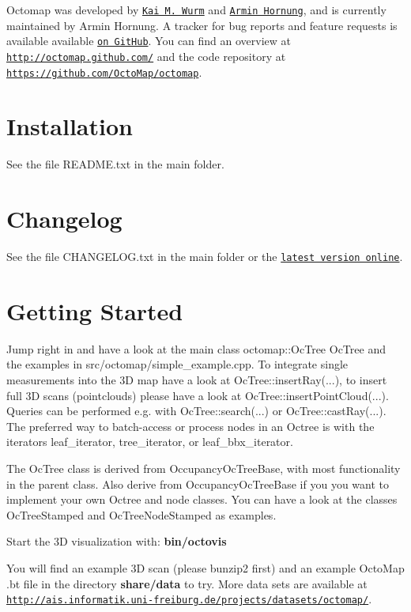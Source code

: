 Octomap was developed by \href{http://www.informatik.uni-freiburg.de/~wurm}{\tt Kai M. Wurm} and \href{http://www.informatik.uni-freiburg.de/~hornunga}{\tt Armin Hornung}, and is currently maintained by Armin Hornung. A tracker for bug reports and feature requests is available available \href{https://github.com/OctoMap/octomap/issues}{\tt on Git\+Hub}. You can find an overview at \href{http://octomap.github.com/}{\tt http\+://octomap.\+github.\+com/} and the code repository at \href{https://github.com/OctoMap/octomap}{\tt https\+://github.\+com/\+Octo\+Map/octomap}.\hypertarget{index_install_sec}{}\section{Installation}\label{index_install_sec}
See the file R\+E\+A\+D\+M\+E.\+txt in the main folder. \hypertarget{index_changelog_sec}{}\section{Changelog}\label{index_changelog_sec}
See the file C\+H\+A\+N\+G\+E\+L\+O\+G.\+txt in the main folder or the \href{https://raw.github.com/OctoMap/octomap/master/octomap/CHANGELOG.txt}{\tt latest version online}. \hypertarget{index_gettingstarted_sec}{}\section{Getting Started}\label{index_gettingstarted_sec}
Jump right in and have a look at the main class octomap\+::\+Oc\+Tree Oc\+Tree and the examples in src/octomap/simple\+\_\+example.\+cpp. To integrate single measurements into the 3\+D map have a look at Oc\+Tree\+:\+:insert\+Ray(...), to insert full 3\+D scans (pointclouds) please have a look at Oc\+Tree\+:\+:insert\+Point\+Cloud(...). Queries can be performed e.\+g. with Oc\+Tree\+:\+:search(...) or Oc\+Tree\+:\+:cast\+Ray(...). The preferred way to batch-\/access or process nodes in an Octree is with the iterators leaf\+\_\+iterator, tree\+\_\+iterator, or leaf\+\_\+bbx\+\_\+iterator.



The Oc\+Tree class is derived from Occupancy\+Oc\+Tree\+Base, with most functionality in the parent class. Also derive from Occupancy\+Oc\+Tree\+Base if you you want to implement your own Octree and node classes. You can have a look at the classes Oc\+Tree\+Stamped and Oc\+Tree\+Node\+Stamped as examples. 

Start the 3\+D visualization with\+: {\bfseries bin/octovis} 

You will find an example 3\+D scan (please bunzip2 first) and an example Octo\+Map .bt file in the directory {\bfseries share/data} to try. More data sets are available at \href{http://ais.informatik.uni-freiburg.de/projects/datasets/octomap/}{\tt http\+://ais.\+informatik.\+uni-\/freiburg.\+de/projects/datasets/octomap/}. 